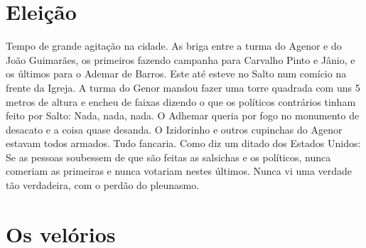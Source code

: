 \documentclass[12pt,brazil,]{book}
\begin{document}
\section{Eleição}\label{eleiuxe7uxe3o}

Tempo de grande agitação na cidade. As briga entre a turma do Agenor e
do João Guimarães, os primeiros fazendo campanha para Carvalho Pinto e
Jânio, e os últimos para o Ademar de Barros. Este até esteve no Salto
num comício na frente da Igreja. A turma do Genor mandou fazer uma torre
quadrada com uns 5 metros de altura e encheu de faixas dizendo o que os
políticos contrários tinham feito por Salto: Nada, nada, nada. O Adhemar
queria por fogo no monumento de desacato e a coisa quase desanda. O
Izidorinho e outros cupinchas do Agenor estavam todos armados. Tudo
fancaria. Como diz um ditado dos Estados Unidos: Se as pessoas soubessem
de que são feitas as salsichas e os políticos, nunca comeriam as
primeiras e nunca votariam nestes últimos. Nunca vi uma verdade tão
verdadeira, com o perdão do pleunasmo.

\section{Os velórios}\label{os-veluxf3rios}
\end{document}

